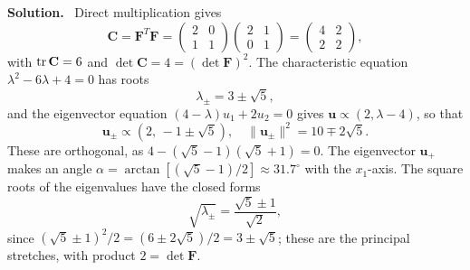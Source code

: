 \documentclass[a4paper,12pt]{paper}
\newenvironment{solution}{\par\noindent\textbf{Solution.}\ }{\par\medskip}
\begin{document}
\begin{solution}
Direct multiplication gives
\begin{equation}
\mathbf{C}=\mathbf{F}^{T}\mathbf{F}=\begin{pmatrix}2&0\\1&1\end{pmatrix}
\begin{pmatrix}2&1\\0&1\end{pmatrix}=\begin{pmatrix}4&2\\2&2\end{pmatrix},
\label{eq:12}
\end{equation}
with $\mathrm{tr}\,\mathbf{C}=6$ and $\det\mathbf{C}=4=(\det\mathbf{F})^{2}$. The characteristic
equation $\lambda^{2}-6\lambda+4=0$ has roots
\begin{equation}
\lambda_{\pm}=3\pm\sqrt{5},
\label{eq:13}
\end{equation}
and the eigenvector equation $(4-\lambda)u_{1}+2u_{2}=0$ gives $\mathbf{u}\propto(2,\lambda-4)$,
so that
\begin{equation}
\mathbf{u}_{\pm}\propto(2,\,-1\pm\sqrt{5}),\quad
\|\mathbf{u}_{\pm}\|^{2}=10\mp2\sqrt{5}.
\label{eq:14}
\end{equation}
These are orthogonal, as $4-(\sqrt{5}-1)(\sqrt{5}+1)=0$. The eigenvector $\mathbf{u}_{+}$ makes
an angle $\alpha=\arctan[(\sqrt{5}-1)/2]\approx31.7^{\circ}$ with the $x_{1}$-axis. The square
roots of the eigenvalues have the closed forms
\begin{equation}
\sqrt{\lambda_{\pm}}=\frac{\sqrt{5}\pm1}{\sqrt{2}},
\label{eq:15}
\end{equation}
since $(\sqrt{5}\pm1)^{2}/2=(6\pm2\sqrt{5})/2=3\pm\sqrt{5}$; these are the principal
stretches, with product $2=\det\mathbf{F}$.


\end{solution}
\end{document}
